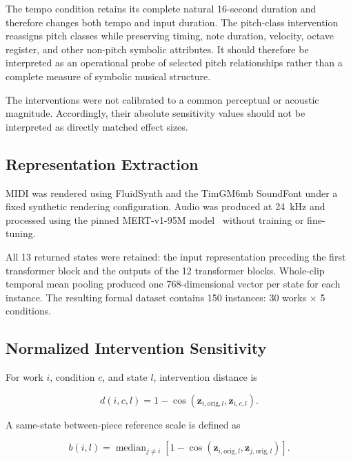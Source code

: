 \documentclass[conference]{IEEEtran}
\begin{document}
The tempo condition retains its complete natural 16-second duration and
therefore changes both tempo and input duration.
The pitch-class intervention reassigns pitch classes while preserving timing,
note duration, velocity, octave register, and other non-pitch symbolic
attributes.
It should therefore be interpreted as an operational probe of selected pitch
relationships rather than a complete measure of symbolic musical structure.

The interventions were not calibrated to a common perceptual or acoustic
magnitude.
Accordingly, their absolute sensitivity values should not be interpreted as
directly matched effect sizes.

\subsection{Representation Extraction}

MIDI was rendered using FluidSynth and the TimGM6mb SoundFont under a fixed
synthetic rendering configuration.
Audio was produced at 24~kHz and processed using the pinned MERT-v1-95M
model~\cite{li2024mert} without training or fine-tuning.

All 13 returned states were retained: the input representation preceding the
first transformer block and the outputs of the 12 transformer blocks.
Whole-clip temporal mean pooling produced one 768-dimensional vector per
state for each instance.
The resulting formal dataset contains 150 instances: 30 works $\times$ 5
conditions.

\subsection{Normalized Intervention Sensitivity}

For work $i$, condition $c$, and state $l$, intervention distance is

\begin{equation}
d(i,c,l)
=
1-\cos
\left(
\mathbf{z}_{i,\mathrm{orig},l},
\mathbf{z}_{i,c,l}
\right).
\label{eq:distance}
\end{equation}

A same-state between-piece reference scale is defined as

\begin{equation}
b(i,l)
=
\operatorname{median}_{j\neq i}
\left[
1-\cos
\left(
\mathbf{z}_{i,\mathrm{orig},l},
\mathbf{z}_{j,\mathrm{orig},l}
\right)
\right].
\label{eq:baseline}
\end{equation}
\end{document}
